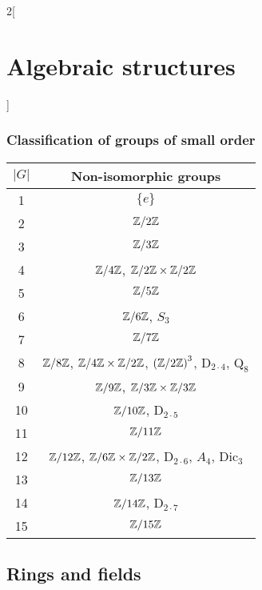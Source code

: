 \documentclass[../../../main.tex]{subfiles}
\begin{document}
\begin{multicols}{2}[\section{Algebraic structures}]
\subsubsection{Classification of groups of small order}
\begin{center}
    \begin{tabular}{|c|c|}
        \hline
        $|G|$ & Non-isomorphic groups\\
        \hline
        1 & $\{e\}$ \\
        \hline
        2 & $\quot{\ZZ}{2\ZZ}$ \\
        \hline
        3 & $\quot{\ZZ}{3\ZZ}$ \\
        \hline
        4 & $\quot{\ZZ}{4\ZZ}$, $\quot{\ZZ}{2\ZZ}\times\quot{\ZZ}{2\ZZ}$ \\
        \hline
        5 & $\quot{\ZZ}{5\ZZ}$ \\
        \hline
        6 & $\quot{\ZZ}{6\ZZ}$, $S_3$ \\
        \hline
        7 & $\quot{\ZZ}{7\ZZ}$ \\
        \hline
        8 & $\quot{\ZZ}{8\ZZ}$, $\quot{\ZZ}{4\ZZ}\times\quot{\ZZ}{2\ZZ}$, $\left(\quot{\ZZ}{2\ZZ}\right)^3$, $\text{D}_{2\cdot 4}$, $\text{Q}_8$ \\
        \hline
        9 & $\quot{\ZZ}{9\ZZ}$, $\quot{\ZZ}{3\ZZ}\times\quot{\ZZ}{3\ZZ}$ \\
        \hline
        10 & $\quot{\ZZ}{10\ZZ}$, $\text{D}_{2\cdot 5}$ \\
        \hline
        11 & $\quot{\ZZ}{11\ZZ}$ \\
        \hline
        12 & $\quot{\ZZ}{12\ZZ}$, $\quot{\ZZ}{6\ZZ}\times\quot{\ZZ}{2\ZZ}$, $\text{D}_{2\cdot 6}$, $A_4$, $\text{Dic}_3$ \\
        \hline
        13 & $\quot{\ZZ}{13\ZZ}$ \\
        \hline
        14 & $\quot{\ZZ}{14\ZZ}$, $\text{D}_{2\cdot 7}$ \\
        \hline
        15 & $\quot{\ZZ}{15\ZZ}$ \\
        \hline
    \end{tabular}
\end{center}
\subsection{Rings and fields}\label{AS-R}

\end{multicols}
\end{document}
